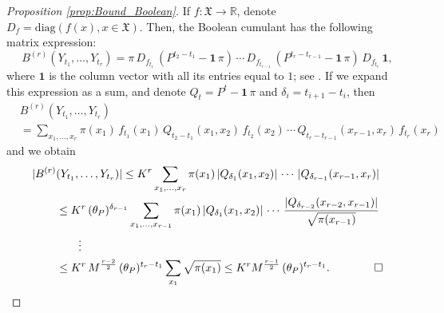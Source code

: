 \documentclass[envcountsame]{svmult}
\newcommand{\R}{\mathbb{R}}
\newcommand{\spa}{\mathfrak{X}}
\begin{document}
\begin{proof}[Proposition \ref{prop:Bound_Boolean}]
If $f:\spa \to \R$, denote $D_f=\mathrm{diag}(f(x),x\in \spa)$. Then, the Boolean cumulant has the following matrix expression:
$$B^{(r)}(Y_{t_1},\ldots,Y_{t_r}) = \pi\,D_{f_{t_1}}\,(P^{t_2-t_1}-\textbf{1}\,\pi)\,\cdots\, D_{f_{t_{r-1}}}\,(P^{t_r-t_{r-1}}-\textbf{1}\,\pi)\,D_{f_{t_r}}\,\textbf{1},$$
where $\textbf{1}$ is the column vector with all its entries equal to $1$; see \cite[Lemma 10.1]{WDG}. If we expand this expression as a sum, and denote $Q_t = P^t - \textbf{1}\,\pi$ and $\delta_i=t_{i+1}-t_i$, then 
\begin{align*}
  &B^{(r)}(Y_{t_1},\ldots,Y_{t_r}) \\
  & = \sum_{x_1,\ldots,x_r}\pi(x_1)\,f_{t_1}(x_1)\,Q_{t_2-t_1}(x_1,x_2)\,f_{t_2}(x_2)\,\cdots\, Q_{t_r-t_{r-1}}(x_{r-1},x_r)\,f_{t_r}(x_r) \end{align*}
  and we obtain
  \begin{align*}
|B^{(r)}&(Y_{t_1},\ldots,Y_{t_r})|\leq K^r \sum_{x_1,\ldots,x_r}\pi(x_1)\,|Q_{\delta_1}(x_1,x_2)|\,\cdots\,|Q_{\delta_{r-1}}(x_{r-1},x_r)| \\
&\leq K^r\,(\theta_P)^{\delta_{r-1}} \sum_{x_1,\ldots,x_{r-1}}\pi(x_1)\,|Q_{\delta_1}(x_1,x_2)|\,\cdots\,\frac{|Q_{\delta_{r-2}}(x_{r-2},x_{r-1})|}{\sqrt{\pi(x_{r-1})}}\\
&\qquad\vdots \\
&\leq K^r\,M^{\frac{r-2}{2}}\,(\theta_P)^{t_r-t_1} \sum_{x_1}\sqrt{\pi(x_1)} \leq K^{r} M^{\frac{r-1}{2}}\,(\theta_P)^{t_r-t_{1}}.\qquad\qed
\end{align*}
\end{proof}
\end{document}
